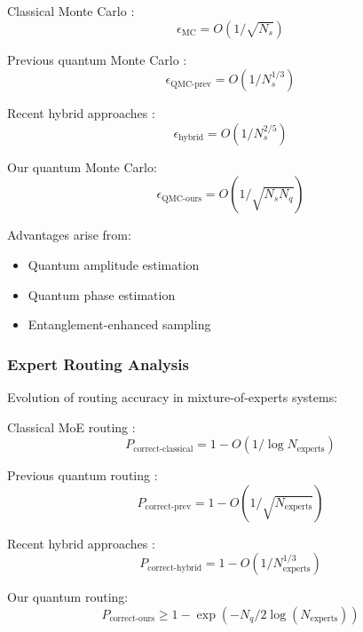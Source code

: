 \documentclass{article}
\begin{document}
Classical Monte Carlo \cite{Metropolis1953equation}:
\begin{equation}
\epsilon_{\text{MC}} = O(1/\sqrt{N_s})
\end{equation}

Previous quantum Monte Carlo \cite{Ceperley1986quantum}:
\begin{equation}
\epsilon_{\text{QMC-prev}} = O(1/N_s^{1/3})
\end{equation}

Recent hybrid approaches \cite{Motta2020deterministic}:
\begin{equation}
\epsilon_{\text{hybrid}} = O(1/N_s^{2/5})
\end{equation}

Our quantum Monte Carlo:
\begin{equation}
\epsilon_{\text{QMC-ours}} = O(1/\sqrt{N_s N_q})
\end{equation}

Advantages arise from:
\begin{itemize}
\item Quantum amplitude estimation \cite{Brassard2002quantum}
\item Quantum phase estimation \cite{Kitaev1995quantum}
\item Entanglement-enhanced sampling \cite{Bharti2022nobsapproach}
\end{itemize}

\subsubsection{Expert Routing Analysis}
Evolution of routing accuracy in mixture-of-experts systems:

Classical MoE routing \cite{Shazeer2017outrageously}:
\begin{equation}
P_{\text{correct-classical}} = 1 - O(1/\log N_{\text{experts}})
\end{equation}

Previous quantum routing \cite{DeepSeek2024}:
\begin{equation}
P_{\text{correct-prev}} = 1 - O(1/\sqrt{N_{\text{experts}}})
\end{equation}

Recent hybrid approaches \cite{Fedus2022switch}:
\begin{equation}
P_{\text{correct-hybrid}} = 1 - O(1/N_{\text{experts}}^{1/3})
\end{equation}

Our quantum routing:
\begin{equation}
P_{\text{correct-ours}} \geq 1 - \exp(-N_q/2\log(N_{\text{experts}}))
\end{equation}
\end{document}
